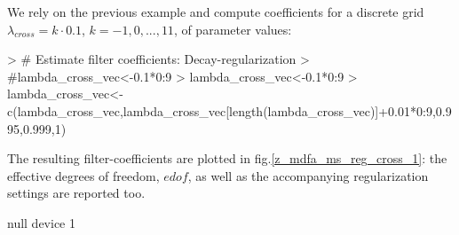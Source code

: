 \documentclass[a4paper]{book}
\begin{document}
We rely on the previous example and compute coefficients for a discrete grid $\lambda_{cross}=k\cdot 0.1$, $k=-1,0,...,11$, of parameter values:  
\begin{Schunk}
\begin{Sinput}
> # Estimate filter coefficients: Decay-regularization
> #lambda_cross_vec<-0.1*0:9
> lambda_cross_vec<-0.1*0:9
> lambda_cross_vec<-c(lambda_cross_vec,lambda_cross_vec[length(lambda_cross_vec)]+0.01*0:9,0.995,0.999,1)
\end{Sinput}
\end{Schunk}
The resulting filter-coefficients  are plotted in fig.\ref{z_mdfa_ms_reg_cross_1}: the effective degrees of freedom, $edof$, as well as the accompanying regularization settings are reported too.
\begin{Schunk}
\begin{Soutput}
null device 
          1 
\end{Soutput}
\end{Schunk}
\end{document}
